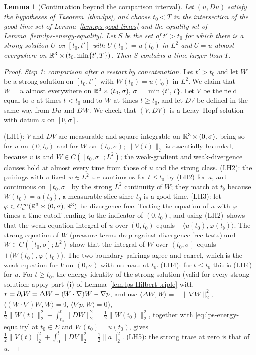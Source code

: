 \documentclass[11pt,letterpaper]{article}
\numberwithin{equation}{section}
\theoremstyle{plain}
\newtheorem{lemma}[theorem]{Lemma}
\theoremstyle{definition}
\theoremstyle{remark}
\begin{document}
\begin{lemma}[Continuation beyond the comparison interval]\label{lem:lps-continuation}
Let $(u,Du)$ satisfy the hypotheses of Theorem~\ref{thm:lps}, and
choose $t_0<T$ in the intersection of the good-time set of
Lemma~\ref{lem:lps-good-times} and the equality set of
Lemma~\ref{lem:lps-energy-equality}. Let $S$ be the set of
$t'>t_0$ for which there is a strong solution $U$ on $[t_0,t']$
with $U(t_0)=u(t_0)$ in $L^2$ and $U=u$ almost everywhere on
$\mathbb{R}^3\times(t_0,\min\{t',T\})$. Then $S$ contains a time larger
than $T$.
\end{lemma}

\begin{proof}
\emph{Step 1: comparison after a restart by concatenation.} Let $t'>t_0$ and
let $W$ be a strong solution on $[t_0,t']$ with $W(t_0)=u(t_0)$ in $L^2$. We
claim that $W=u$ almost everywhere on $\mathbb{R}^3\times(t_0,\sigma)$,
$\sigma=\min\{t',T\}$. Let $V$ be the field equal to $u$ at times $t<t_0$ and
to $W$ at times $t\ge t_0$, and let $DV$ be defined in the same way from $Du$
and $DW$. We check that $(V,DV)$ is a Leray--Hopf solution with datum $a$ on
$[0,\sigma]$.

(LH1): $V$ and $DV$ are measurable and square integrable on
$\mathbb{R}^3\times(0,\sigma)$, being so for $u$ on $(0,t_0)$ and for $W$ on
$(t_0,\sigma)$; $\|V(t)\|_2$ is essentially bounded, because $u$ is and
$W\in C([t_0,\sigma];L^2)$; the weak-gradient and weak-divergence clauses hold
at almost every time from those of $u$ and the strong class. (LH2): the
pairings with a fixed $w\in L^2$ are continuous for $t\le t_0$ by (LH2) for
$u$, and continuous on $[t_0,\sigma]$ by the strong $L^2$ continuity of $W$;
they match at $t_0$ because $W(t_0)=u(t_0)$, a measurable slice since
$t_0$ is a good time. (LH3): let $\varphi\in C_c^\infty(\mathbb{R}^3\times(0,\sigma);\mathbb{R}^3)$ be
divergence free. Testing the equation of $u$ with $\varphi$ times a time
cutoff tending to the indicator of $(0,t_0)$, and using (LH2), shows that the
weak-equation integral of $u$ over $(0,t_0)$ equals $-\langle
u(t_0),\varphi(t_0)\rangle$. The strong equation of $W$ (pressure terms drop
against divergence-free tests) and $W\in C([t_0,\sigma];L^2)$ show that the
integral of $W$ over $(t_0,\sigma)$ equals $+\langle
W(t_0),\varphi(t_0)\rangle$. The two boundary pairings agree and cancel, which
is the weak equation for $V$ on $(0,\sigma)$ with no mass at $t_0$. (LH4): for
$t\le t_0$ this is (LH4) for $u$. For $t\ge t_0$, the energy identity of the
strong solution (valid for every strong solution: apply part~(i) of Lemma~\ref{lem:lps-Hilbert-triple} with $r=\partial_t W=\Delta W-(W\cdot\nabla)W-\nabla p$, and use $\langle\Delta W,W\rangle=-\|\nabla W\|_2^2$, $\langle(W\cdot\nabla)W,W\rangle=0$, $\langle\nabla p,W\rangle=0$), $\frac12\|W(t)\|_2^2+\int_{t_0}^t\|DW\|_2^2
=\frac12\|W(t_0)\|_2^2$, together with
\eqref{eq:lps-energy-equality} at $t_0\in E$ and $W(t_0)=u(t_0)$, gives
$\frac12\|V(t)\|_2^2+\int_0^t\|DV\|_2^2=\frac12\|a\|_2^2$. (LH5): the strong
trace at zero is that of $u$.


\end{proof}
\end{document}
